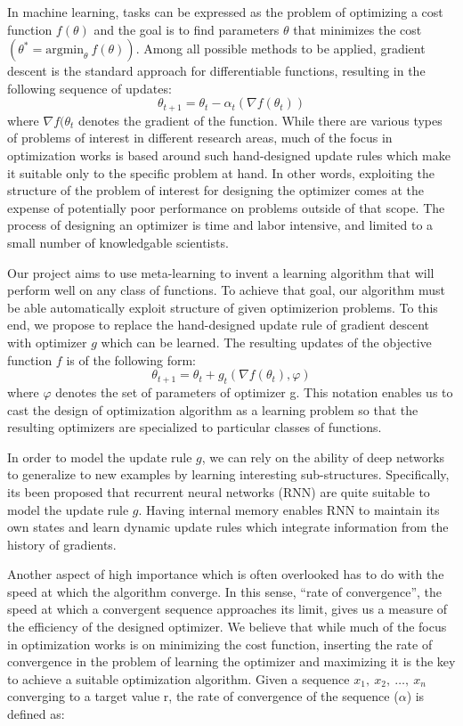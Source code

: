 \documentclass[a4paper, 11pt]{article}
\begin{document}
In machine learning, tasks can be expressed as the problem of optimizing a cost function $f(\theta)$ and the goal is to find parameters $\theta$ that minimizes the cost $(\theta^*=\text{argmin}_{\theta} \ f(\theta))$. Among all possible methods to be applied, gradient descent is the standard approach for differentiable functions, resulting in the following sequence of updates:
$$\theta_{t+1}=\theta_{t}-\alpha_t(\nabla f(\theta_{t}))$$
where $\nabla f(\theta_{t}$ denotes the gradient of the function. While there are various types of problems of interest in different research areas, much of the focus in optimization works is based around such hand-designed update rules which make it suitable only to the specific problem at hand. In other words, exploiting the structure of the problem of interest for designing the optimizer comes at the expense of potentially poor performance on problems outside of that scope. The process of designing an optimizer is time and labor intensive, and limited to a small number of knowledgable scientists.

Our project aims to use meta-learning to invent a learning algorithm that will perform well on any class of functions. To achieve that goal, our algorithm must be able automatically exploit structure of given optimizerion problems. To this end, we propose to replace the hand-designed update rule of gradient descent with optimizer $g$ which can be learned. The resulting updates of the objective function $f$ is of the following form:
$$\theta_{t+1}=\theta_{t}+g_t(\nabla f(\theta_{t}),\varphi)$$
where $\varphi$ denotes the set of parameters of optimizer g. This notation enables us to cast the design of optimization algorithm as a learning problem so that the resulting optimizers are specialized to particular classes of functions. 

In order to model the update rule $g$, we can rely on the ability of deep networks to generalize to new examples by learning interesting sub-structures. Specifically, it\textsc{}s been proposed that recurrent neural networks (RNN) are quite suitable to model the update rule $g$. Having internal memory enables RNN to maintain its own states and learn dynamic update rules which integrate information from the history of gradients. 

Another aspect of high importance which is often overlooked has to do with the speed at which the algorithm converge.  In this sense, \enquote{rate of convergence}, the speed at which a convergent sequence approaches its limit, gives us a measure of the efficiency of the designed optimizer. We believe that while much of the focus in optimization works is on minimizing the cost function, inserting the rate of convergence in the problem of learning the optimizer and maximizing it is the key to achieve a suitable optimization algorithm. 
Given a sequence $x_1,\ x_2,\ \ldots,\ x_n$ converging to a target value r, the rate of convergence of the sequence ($\alpha$) is defined as:
\end{document}
